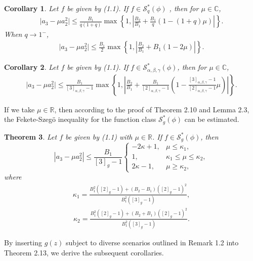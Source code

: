 \documentclass[11pt,twoside, reqno]{article}
\newtheorem{theorem}{Theorem}[section]
\newtheorem{corollary}[theorem]{Corollary}
\theoremstyle{definition}
\begin{document}
\begin{corollary}
Let $f$ be given by (1.1). If $f\in\mathcal{S}^{\ast }_{q}(\phi)$ , then for $\mu \in \mathbb{C}$,
\begin{align}\nonumber
\mid a_3-\mu a_2^2\mid\leq \frac{B_{1}}{q(1+q)}\max\left\{1,\left|\frac{B_{2}}{B_{1}}+
\frac{B_{1}}{q}\left(1-(1+q)\mu\right)\right|\right\}.
\end{align}
When $q\rightarrow1^{-}$,
\begin{align}\nonumber
\mid a_3-\mu a_2^2\mid\leq \frac{B_{1}}{2}\max\left\{1,\left|\frac{B_{2}}{B_{1}}+
B_{1}\left(1-2\mu\right)\right|\right\}.
\end{align}
\end{corollary}

\begin{corollary}
Let $f$ be given by (1.1). If $f\in\mathcal{S}^{\ast }_{\alpha, \beta, \gamma}(\phi)$, then for $\mu \in \mathbb{C}$,
\begin{align}\nonumber
\mid a_3-\mu a_2^2\mid\leq \frac{B_{1}}{[3]_{\alpha, \beta, \gamma}-1}\max\left\{1,\left|\frac{B_{2}}{B_{1}}+
\frac{B_{1}}{[2]_{\alpha, \beta, \gamma}-1}\left(1-\frac{[3]_{\alpha, \beta, \gamma}-1}{[2]_{\alpha, \beta, \gamma}-1}\mu\right)\right|\right\}.
\end{align}
\end{corollary}
If we take $\mu \in \mathbb{R}$, then according to the proof of Theorem 2.10 and Lemma 2.3, the Fekete-Szeg\"{o} inequality for the function class $\mathcal{S}^{\ast }_{g}(\phi)$ can be estimated.
\begin{theorem}
Let $f$ be given by (1.1) with $\mu \in \mathbb{R}$. If $f \in \mathcal{S}^{\ast }_{g}(\phi)$, then
\begin{equation*}
\left|a_{3} - \mu a_{2}^{2}\right| \leq \frac{B_{1}}{[3]_{g}-1}
\begin{cases}
-2\kappa + 1, & \mu \leq \kappa_{1}, \\
1, &  \kappa_{1} \leq \mu \leq \kappa_{2}, \\
2\kappa - 1, &  \mu \geq \kappa_{2},
\end{cases}
\end{equation*}
where
\begin{align}\nonumber
\kappa_{1}=\frac{B_{1}^{2}([2]_{g}-1)+(B_{2}-B_{1})([2]_{g}-1)^{2}}{B_{1}^{2}([3]_{g}-1)},
\end{align}
\begin{align}\nonumber
\kappa_{2}=\frac{B_{1}^{2}([2]_{g}-1)+(B_{2}+B_{1})([2]_{g}-1)^{2}}{B_{1}^{2}([3]_{g}-1)}.
\end{align}
\end{theorem}
By inserting $g(z)$ subject to diverse scenarios outlined in Remark 1.2 into Theorem 2.13, we derive the subsequent corollaries.
\end{document}
